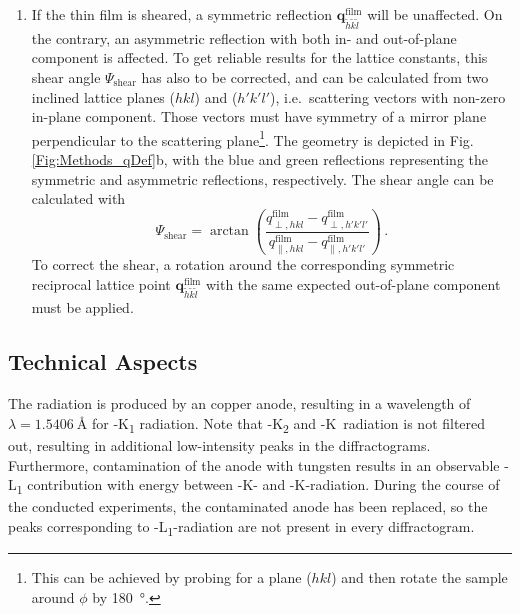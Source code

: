 \begin{enumerate}
    \item If the thin film is sheared, a symmetric reflection $\mathbf{q}_{\tilde{h}\tilde{k}\tilde{l}}^\mathrm{film}$ will be unaffected.
    On the contrary, an asymmetric reflection with both in- and out-of-plane component is affected.
    To get reliable results for the lattice constants, this shear angle $\Psi_\mathrm{shear}$ has also to be corrected, and can be calculated from two inclined lattice planes ($hkl$) and ($h'k'l'$), i.e.\ scattering vectors with non-zero in-plane component.
    Those vectors must have symmetry of a mirror plane perpendicular to the scattering plane\footnote{
        This can be achieved by probing for a plane ($hkl$) and then rotate the sample around $\phi$ by \qty{180}{\degree}.
    }.
    The geometry is depicted in Fig.\,\ref{Fig:Methods_qDef}b, with the blue and green reflections representing the symmetric and asymmetric reflections, respectively.
    The shear angle can be calculated with
    \begin{equation}
        \Psi_\mathrm{shear}=\arctan\left(\frac{
            q_{\perp,hkl}^\mathrm{film}
            -q_{\perp,h'k'l'}^\mathrm{film}
        }{
            q_{\parallel,hkl}^\mathrm{film}
            -q_{\parallel,h'k'l'}^\mathrm{film}
        }\right)\,.
    \end{equation}
    To correct the shear, a rotation around the corresponding symmetric reciprocal lattice point $\mathbf{q}_{\tilde{h}\tilde{k}\tilde{l}}^\mathrm{film}$ with the same expected out-of-plane component must be applied.
\end{enumerate}

\subsection{Technical Aspects}
The radiation is produced by an copper anode, resulting in a wavelength of $\lambda=\qty{1.5406}{\angstrom}$ for -K\textalpha\textsubscript{1} radiation.
Note that -K\textalpha\textsubscript{2} and -K\textbeta\ radiation is not filtered out, resulting in additional low-intensity peaks in the diffractograms.
Furthermore, contamination of the anode with tungsten results in an observable -L\textalpha\textsubscript{1} contribution with energy between -K\textalpha- and -K\textbeta-radiation.
During the course of the conducted experiments, the contaminated anode has been replaced, so the peaks corresponding to -L\textalpha\textsubscript{1}-radiation are not present in every diffractogram.

